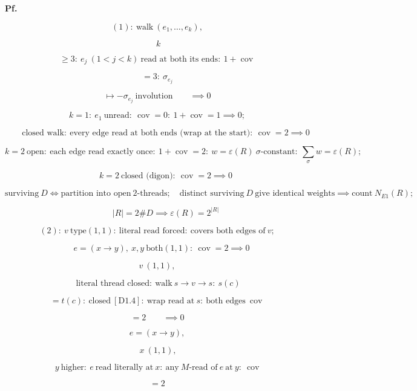 \begin{theorem}
\textbf{Pf.}

\[
(1):\ \text{walk}\ (e_1,\dots,e_k),
\]

\[
\ k
\]

\[
\ge 3:\ e_j\ (1<j<k)\ \text{read at both its ends}:\ 1+\operatorname{cov}
\]

\[
= 3:\ \sigma_{e_j}
\]

\[
\mapsto -\sigma_{e_j}\ \text{involution}\qquad \implies 0
\]

\[
k=1:\ e_1\ \text{unread}:\ \operatorname{cov}=0:\ 1+\operatorname{cov}=1\implies0;
\]

\[
\qquad \text{closed walk}:\ \text{every edge read at both ends (wrap at the start)}:\ \operatorname{cov}=2\implies0
\]

\[
k=2\ \text{open}:\ \text{each edge read exactly once}:\ 1+\operatorname{cov}=2:\ w=\varepsilon(R)\ \sigma\text{-constant}:\ \sum_\sigma w=\varepsilon(R);
\]

\[
\qquad k=2\ \text{closed (digon)}:\ \operatorname{cov}=2\implies0
\]

\[
\text{surviving}\ D\iff\text{partition into open}\ 2\text{-threads};\quad\text{distinct surviving}\ D\ \text{give identical weights}\implies\text{count}\ N_{E1}(R);
\]

\[
\qquad |R|=2\#D\implies\varepsilon(R)=2^{|R|}
\]

\[
(2):\ v\ \text{type}(1,1):\ \text{literal read forced}:\ \text{covers both edges of}\ v;
\]

\[
\quad e=(x{\to}y),\ x,y\ \text{both}(1,1):\ \operatorname{cov}=2\implies0
\]

\[
v\ (1,1),
\]

\[
\ \text{literal thread closed}:\ \text{walk}\ s\to v\to s:\ s(c)
\]

\[
= t(c):\ \text{closed}\ [\mathrm{D1.4}]:\ \text{wrap read at}\ s:\ \text{both edges}\ \operatorname{cov}
\]

\[
= 2\qquad \implies 0
\]

\[
e = (x{\to}y),
\]

\[
\ x\ (1,1),
\]

\[
\ y\ \text{higher}:\ e\ \text{read literally at}\ x:\ \text{any}\ M\text{-read of}\ e\ \text{at}\ y:\ \operatorname{cov}
\]

\[
= 2
\]


\end{theorem}
